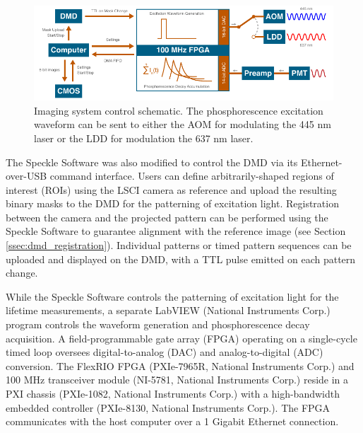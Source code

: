 \begin{figure}
    \includegraphics{figures/chapter_2/controlschematic.pdf}
    \caption{
        \label{fig:controlschematic}
        Imaging system control schematic. The phosphorescence excitation waveform can be sent to either the AOM for modulating the 445 nm laser or the LDD for modulation the 637 nm laser.
    }
\end{figure}

The Speckle Software was also modified to control the DMD via its Ethernet-over-USB command interface. Users can define arbitrarily-shaped regions of interest (ROIs) using the LSCI camera as reference and upload the resulting binary masks to the DMD for the patterning of excitation light. Registration between the camera and the projected pattern can be performed using the Speckle Software to guarantee alignment with the reference image (see Section \ref{ssec:dmd_registration}). Individual patterns or timed pattern sequences can be uploaded and displayed on the DMD, with a TTL pulse emitted on each pattern change.

While the Speckle Software controls the patterning of excitation light for the lifetime measurements, a separate LabVIEW (National Instruments Corp.) program controls the waveform generation and phosphorescence decay acquisition. A field-programmable gate array (FPGA) operating on a single-cycle timed loop oversees digital-to-analog (DAC) and analog-to-digital (ADC) conversion. The FlexRIO FPGA (PXIe-7965R, National Instruments Corp.) and 100 MHz transceiver module (NI-5781, National Instruments Corp.) reside in a PXI chassis (PXIe-1082, National Instruments Corp.) with a high-bandwidth embedded controller (PXIe-8130, National Instruments Corp.). The FPGA communicates with the host computer over a 1 Gigabit Ethernet connection.

